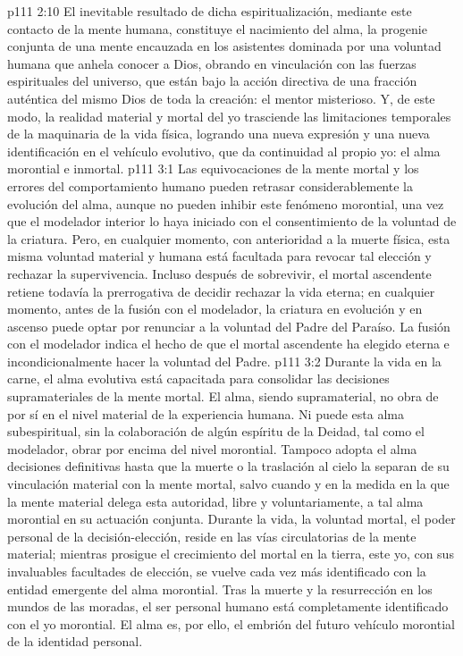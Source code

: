 \vs p111 2:10 El inevitable resultado de dicha espiritualización, mediante este contacto de la mente humana, constituye el nacimiento del alma, la progenie conjunta de una mente encauzada en los asistentes dominada por una voluntad humana que anhela conocer a Dios, obrando en vinculación con las fuerzas espirituales del universo, que están bajo la acción directiva de una fracción auténtica del mismo Dios de toda la creación: el mentor misterioso. Y, de este modo, la realidad material y mortal del yo trasciende las limitaciones temporales de la maquinaria de la vida física, logrando una nueva expresión y una nueva identificación en el vehículo evolutivo, que da continuidad al propio yo: el alma morontial e inmortal.
\vs p111 3:1 Las equivocaciones de la mente mortal y los errores del comportamiento humano pueden retrasar considerablemente la evolución del alma, aunque no pueden inhibir este fenómeno morontial, una vez que el modelador interior lo haya iniciado con el consentimiento de la voluntad de la criatura. Pero, en cualquier momento, con anterioridad a la muerte física, esta misma voluntad material y humana está facultada para revocar tal elección y rechazar la supervivencia. Incluso después de sobrevivir, el mortal ascendente retiene todavía la prerrogativa de decidir rechazar la vida eterna; en cualquier momento, antes de la fusión con el modelador, la criatura en evolución y en ascenso puede optar por renunciar a la voluntad del Padre del Paraíso. La fusión con el modelador indica el hecho de que el mortal ascendente ha elegido eterna e incondicionalmente hacer la voluntad del Padre.
\vs p111 3:2 Durante la vida en la carne, el alma evolutiva está capacitada para consolidar las decisiones supramateriales de la mente mortal. El alma, siendo supramaterial, no obra de por sí en el nivel material de la experiencia humana. Ni puede esta alma subespiritual, sin la colaboración de algún espíritu de la Deidad, tal como el modelador, obrar por encima del nivel morontial. Tampoco adopta el alma decisiones definitivas hasta que la muerte o la traslación al cielo la separan de su vinculación material con la mente mortal, salvo cuando y en la medida en la que la mente material delega esta autoridad, libre y voluntariamente, a tal alma morontial en su actuación conjunta. Durante la vida, la voluntad mortal, el poder personal de la decisión\hyp{}elección, reside en las vías circulatorias de la mente material; mientras prosigue el crecimiento del mortal en la tierra, este yo, con sus invaluables facultades de elección, se vuelve cada vez más identificado con la entidad emergente del alma morontial. Tras la muerte y la resurrección en los mundos de las moradas, el ser personal humano está completamente identificado con el yo morontial. El alma es, por ello, el embrión del futuro vehículo morontial de la identidad personal.
